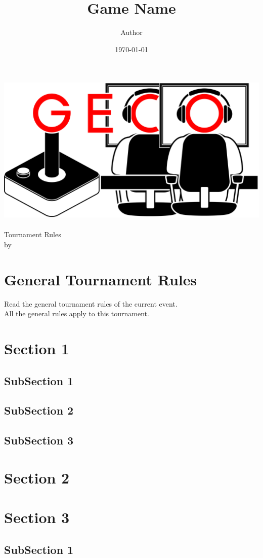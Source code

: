 \documentclass{article}
\title{Game Name}
\author{Author}
\date{\today}
\begin{document}
\makeatletter
\begin{titlepage}
\centering
\includegraphics[scale=0.075]{GECo.png}\\
\LARGE \@title\\ Tournament Rules\\ \normalsize by \@author\\ \@date
\end{titlepage}
\makeatother


\clearpage

\tableofcontents
\clearpage

\section{General Tournament Rules}
Read the general tournament rules of the current event.\\
All the general rules apply to this tournament.

\section{Section 1}
\subsection{SubSection 1}

\subsection{SubSection 2}

\subsection{SubSection 3}


\section{Section 2}

\section{Section 3}
\subsection{SubSection 1}
\end{document}
